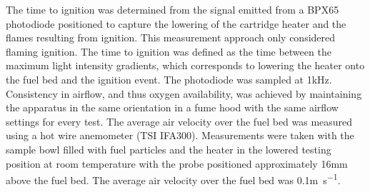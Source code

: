     The time to ignition was determined from the signal emitted from a BPX65 photodiode positioned to capture the lowering of the cartridge heater and the flames resulting from ignition. This measurement approach only considered flaming ignition. The time to ignition was defined as the time between the maximum light intensity gradients, which corresponds to lowering the heater onto the fuel bed and the ignition event. The photodiode was sampled at 1kHz. Consistency in airflow, and thus oxygen availability, was achieved by maintaining the apparatus in the same orientation in a fume hood with the same airflow settings for every test. The average air velocity over the fuel bed was measured using a hot wire anemometer (TSI IFA300). Measurements were taken with the sample bowl filled with fuel particles and the heater in the lowered testing position at room temperature with the probe positioned approximately 16\si{\milli\meter} above the fuel bed. The average air velocity over the fuel bed was 0.1\si{\meter\per\second}.
